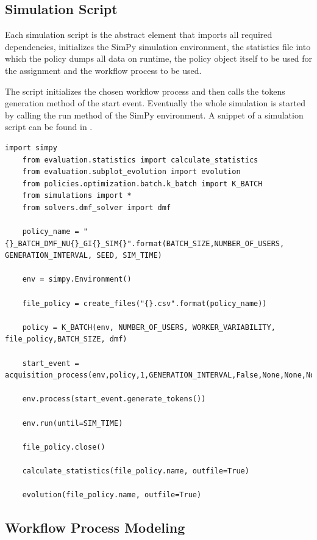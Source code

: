 \documentclass[draft=false]{seal_thesis}
\begin{document}
\subsection{Simulation Script}

Each simulation script is the abstract element that imports all required dependencies, initializes the SimPy simulation environment, the statistics file into which the policy dumps all data on runtime, the policy object itself to be used for the assignment and the workflow process to be used. 

The script initializes the chosen workflow process and then calls the tokens generation method of the start event. Eventually the whole simulation is started by calling the run method of the SimPy environment. A snippet of a simulation script can be found in .

\begin{lstlisting}[caption=Example of the structure of a simulation script. Here for the K-Batch policy using the \gls{dmf} solver,label=lst:simulation_script,style=CustomPython]
	import simpy
	from evaluation.statistics import calculate_statistics
	from evaluation.subplot_evolution import evolution
	from policies.optimization.batch.k_batch import K_BATCH
	from simulations import *
	from solvers.dmf_solver import dmf

	policy_name = "{}_BATCH_DMF_NU{}_GI{}_SIM{}".format(BATCH_SIZE,NUMBER_OF_USERS, GENERATION_INTERVAL, SEED, SIM_TIME)

	env = simpy.Environment()

	file_policy = create_files("{}.csv".format(policy_name))

	policy = K_BATCH(env, NUMBER_OF_USERS, WORKER_VARIABILITY, file_policy,BATCH_SIZE, dmf)

	start_event = acquisition_process(env,policy,1,GENERATION_INTERVAL,False,None,None,None)

	env.process(start_event.generate_tokens())

	env.run(until=SIM_TIME)

	file_policy.close()

	calculate_statistics(file_policy.name, outfile=True)

	evolution(file_policy.name, outfile=True)
\end{lstlisting}

\subsection{Workflow Process Modeling}
\end{document}
